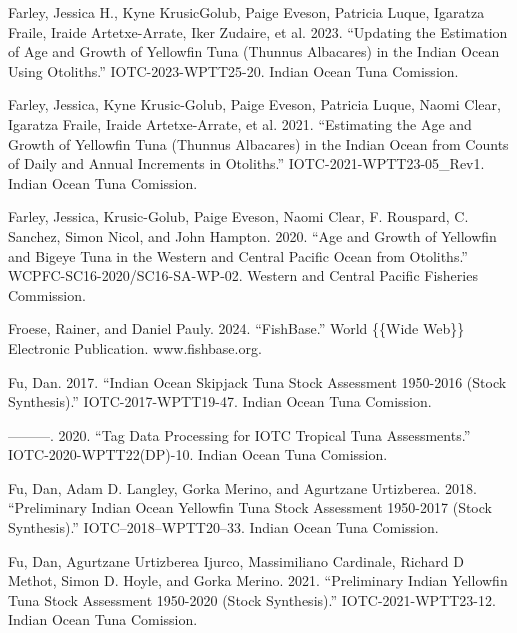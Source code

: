 \documentclass[
]{scrartcl}
\newlength{\cslhangindent}
\newenvironment{CSLReferences}[2] %
 {\begin{list}{}{%
  \setlength{\itemindent}{0pt}
  \setlength{\leftmargin}{0pt}
  \setlength{\parsep}{0pt}
  \ifodd #1
   \setlength{\leftmargin}{\cslhangindent}
   \setlength{\itemindent}{-1\cslhangindent}
  \fi
  \setlength{\itemsep}{#2\baselineskip}}}
 {\end{list}}
\begin{document}
\begin{CSLReferences}{1}{0}
Farley, Jessica H., Kyne KrusicGolub, Paige Eveson, Patricia Luque,
Igaratza Fraile, Iraide Artetxe-Arrate, Iker Zudaire, et al. 2023.
{``Updating the Estimation of Age and Growth of Yellowfin Tuna
({Thunnus} Albacares) in the {Indian Ocean} Using Otoliths.''}
IOTC-2023-WPTT25-20. Indian Ocean Tuna Comission.

Farley, Jessica, Kyne Krusic-Golub, Paige Eveson, Patricia Luque, Naomi
Clear, Igaratza Fraile, Iraide Artetxe-Arrate, et al. 2021.
{``Estimating the Age and Growth of Yellowfin Tuna ({Thunnus} Albacares)
in the {Indian Ocean} from Counts of Daily and Annual Increments in
Otoliths.''} IOTC-2021-WPTT23-05\_Rev1. Indian Ocean Tuna Comission.

Farley, Jessica, Krusic-Golub, Paige Eveson, Naomi Clear, F. Rouspard,
C. Sanchez, Simon Nicol, and John Hampton. 2020. {``Age and Growth of
Yellowfin and Bigeye Tuna in the Western and Central {Pacific Ocean}
from Otoliths.''} WCPFC-SC16-2020/SC16-SA-WP-02. {Western and Central
Pacific Fisheries Commission}.

Froese, Rainer, and Daniel Pauly. 2024. {``{FishBase}.''} World \{\{Wide
Web\}\} Electronic Publication. www.fishbase.org.

Fu, Dan. 2017. {``Indian Ocean Skipjack Tuna Stock Assessment 1950-2016
({Stock Synthesis}).''} IOTC-2017-WPTT19-47. Indian Ocean Tuna
Comission.

---------. 2020. {``Tag Data Processing for {IOTC} Tropical Tuna
Assessments.''} IOTC-2020-WPTT22(DP)-10. Indian Ocean Tuna Comission.

Fu, Dan, Adam D. Langley, Gorka Merino, and Agurtzane Urtizberea. 2018.
{``Preliminary {Indian Ocean Yellowfin Tuna Stock Assessment} 1950-2017
({Stock Synthesis}).''} IOTC--2018--WPTT20--33. Indian Ocean Tuna
Comission.

Fu, Dan, Agurtzane Urtizberea Ijurco, Massimiliano Cardinale, Richard D
Methot, Simon D. Hoyle, and Gorka Merino. 2021. {``Preliminary {Indian
Yellowfin} Tuna Stock Assessment 1950-2020 ({Stock Synthesis}).''}
IOTC-2021-WPTT23-12. Indian Ocean Tuna Comission.


\end{CSLReferences}
\end{document}

